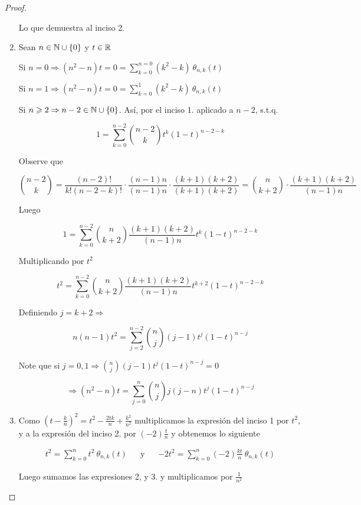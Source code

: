 \begin{proof}
\begin{enumerate}
        Lo que demuestra al inciso 2.

        \item Sean $n \in \mathbb{N} \cup \{ 0 \}$ y $t \in \mathbb{R}$

        Si $n = 0 \Rightarrow (n^2-n)t = 0 = \sum\limits_{k=0}^{n=0} (k^2-k)\: {\theta}_{n,k} (t)$

        Si $n = 1 \Rightarrow (n^2-n)t = 0 = \sum\limits_{k=0}^{1} (k^2-k)\: {\theta}_{n,k} (t)$

        Si $n  \geqslant 2  \Rightarrow n - 2 \in \mathbb{N} \cup \{0\}$. Así, por el inciso 1. aplicado a $n-2$, s.t.q.

        $$1 = \sum\limits_{k=0}^{n-2}  \binom{n-2}{k} {t}^{k}{(1-t)}^{n-2-k} $$

        Observe que 

        $$\binom{n-2}{k} = \frac{(n-2)!}{k!(n-2-k)!} \cdot \frac{(n-1)n}{(n-1)n} \cdot \frac{(k+1)(k+2)}{(k+1)(k+2)} = \binom{n}{k+2} \cdot \frac{(k+1)(k+2)}{(n-1)n}$$

        Luego

        $$1 = \sum\limits_{k=0}^{n-2}  \binom{n}{k+2}  \frac{(k+1)(k+2)}{(n-1)n} {t}^{k}{(1-t)}^{n-2-k}$$

        Multiplicando por $t^2$

        $$t^2 = \sum\limits_{k=0}^{n-2}  \binom{n}{k+2}  \frac{(k+1)(k+2)}{(n-1)n} {t}^{k+2}{(1-t)}^{n-2-k}$$

        Definiendo $j = k+ 2 \Rightarrow$

        $$n(n-1) t^2 = \sum\limits_{j=2}^{n-2}  \binom{n}{j}  (j-1) {t}^{j}{(1-t)}^{n-j}$$

        Note que si $j = 0,1 \Rightarrow \binom{n}{j} (j-1) {t}^{j}{(1-t)}^{n-j} = 0$

        $$\Rightarrow (n^2-n)t = \sum\limits_{j=0}^{n} \binom{n}{j} j(j-n) {t}^{j}{(1-t)}^{n-j} $$

        \item Como ${\left(t - \frac{k}{n} \right)}^{2} = t^2-\frac{2tk}{n} + \frac{k^2}{n^2}$ multiplicamos la expresión del inciso 1 por $t^2$, y a la expresión del inciso 2. por $(-2)\frac{t}{n}$ y obtenemos lo siguiente

        \begin{align*}
           t^2 = \sum\limits_{k=0}^{n} t^2 \: {\theta}_{n,k} (t) && \text{y} && -2t^2 = \sum\limits_{k=0}^{n} (-2) \frac{kt}{n}\: {\theta}_{n,k} (t)
        \end{align*}

        Luego sumamos las expresiones 2, y 3. y multiplicamos por $\frac{1}{n^2}$


\end{enumerate}
\end{proof}
